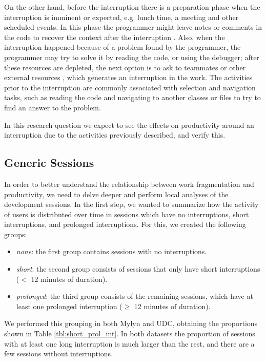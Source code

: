 \documentclass[times]{smrauth}
\newcommand\RR[1]{\textbf{Romain #1}}
\begin{document}
On the other hand, before the interruption there is a preparation phase when the interruption is imminent or expected, e.g. lunch time, a meeting and other scheduled events. In this phase the programmer might leave notes or comments in the code to recover the context after the interruption \cite{PD10}. Also, when the interruption happened because of a problem found by the programmer, the programmer may try to solve it by reading the code, or using the debugger;%
after these resources are depleted, the next option is to ask to teammates or other external resources \cite{LVD06}, which generates an interruption in the work. The activities prior to the interruption are commonly associated with selection and navigation tasks, such as reading the code and navigating to another classes or files to try to find an answer to the problem. 

In this research question we expect to see the effects on productivity around an interruption due to the activities previously described, and verify this.


\subsection{Generic Sessions}

In order to better understand the relationship between work fragmentation and productivity, we need to delve deeper and perform local analyses of the development sessions. In the first step, we wanted to summarize how the activity of users is distributed over time in sessions which have no interruptions, short interruptions, and prolonged interruptions. For this, we created the following groups:
\begin{itemize}
	\item \textit{none}: the first group contains sessions with no interruptions.
	\item \textit{short}: the second group consists of sessions that only have short interruptions ($<$ 12 minutes of duration). 
	\item \textit{prolonged}: the third group consists of the remaining sessions, which have at least one prolonged interruption ($\geq$ 12 minutes of duration). 
\end{itemize} 

We performed this grouping in both Mylyn and UDC, obtaining the proportions shown in Table \ref{tbl:short_prol_int}. In both datasets the proportion of sessions with at least one long interruption is much larger than the rest, and there are a few sessions without interruptions.
\end{document}
